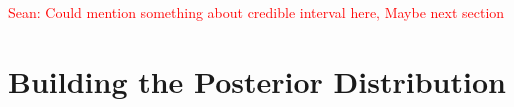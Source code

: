 \documentclass{ucdgradtaughtthesis}
\newcommand{\Sean}[1]{{\textcolor{red}{{Sean: #1}} }}
\begin{document}




\Sean{Could mention something about credible interval here, Maybe next section}




\section{Building the Posterior Distribution}
\label{sec: priortoposterior}
\end{document}
